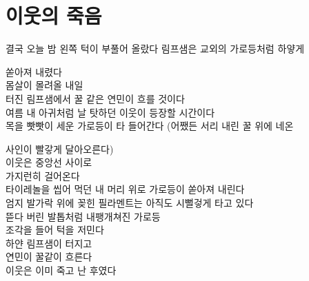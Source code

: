 \hypertarget{uxc774uxc6c3uxc758-uxc8fduxc74c}{%

\section{이웃의 죽음}\label{uxc774uxc6c3uxc758-uxc8fduxc74c}}



결국 오늘 밤 왼쪽 턱이 부풀어 올랐다 림프샘은 교외의 가로등처럼 하얗게

쏟아져 내렸다\\

몸살이 몰려올 내일\\

터진 림프샘에서 꿀 같은 연민이 흐를 것이다\\

여름 내 아귀처럼 날 탓하던 이웃이 등장할 시간이다\\

목을 빳빳이 세운 가로등이 타 들어간다 (어쨌든 서리 내린 꿀 위에 네온

사인이 빨갛게 달아오른다)\\

이웃은 중앙선 사이로\\

가지런히 걸어온다\\

타이레놀을 씹어 먹던 내 머리 위로 가로등이 쏟아져 내린다\\

엄지 발가락 위에 꽂힌 필라멘트는 아직도 시뻘겋게 타고 있다\\

뜯다 버린 발톱처럼 내팽개쳐진 가로등\\

조각을 들어 턱을 저민다\\

하얀 림프샘이 터지고\\

연민이 꿀같이 흐른다\\

이웃은 이미 죽고 난 후였다

